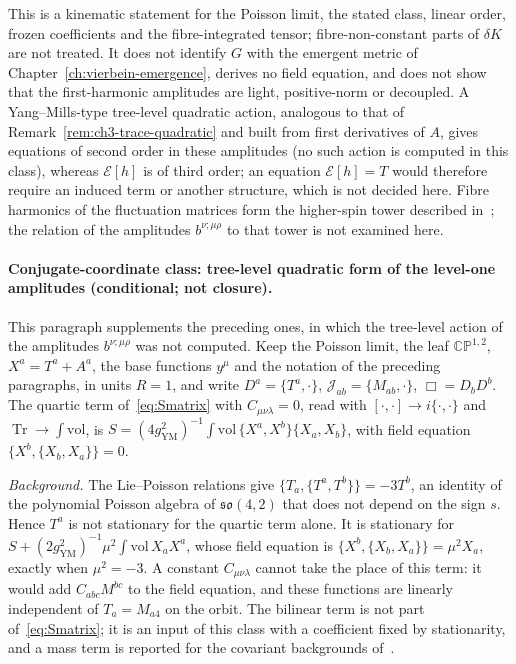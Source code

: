 This is a kinematic statement for the Poisson limit, the stated class, linear order, frozen coefficients and the fibre-integrated tensor; fibre-non-constant parts of \(\delta K\) are not treated. It does not identify \(G\) with the emergent metric of Chapter~\ref{ch:vierbein-emergence}, derives no field equation, and does not show that the first-harmonic amplitudes are light, positive-norm or decoupled. A Yang--Mills-type tree-level quadratic action, analogous to that of Remark~\ref{rem:ch3-trace-quadratic} and built from first derivatives of \(A\), gives equations of second order in these amplitudes (no such action is computed in this class), whereas \(\mathcal E[h]\) is of third order; an equation \(\mathcal E[h]=T\) would therefore require an induced term or another structure, which is not decided here. Fibre harmonics of the fluctuation matrices form the higher-spin tower described in~\cite{SperlingSteinacker2019,MantaSteinacker2025}; the relation of the amplitudes \(b^{\nu;\mu\rho}\) to that tower is not examined here.





\paragraph{Conjugate-coordinate class: tree-level quadratic form of the level-one amplitudes (conditional; not closure).} \label{detail:sec-F-paragraphconjugatecoordinatecl-31}

This paragraph supplements the preceding ones, in which the tree-level action of the amplitudes \(b^{\nu;\mu\rho}\) was not computed. Keep the Poisson limit, the leaf \(\mathbb{CP}^{1,2}\), \(X^a=T^a+A^a\), the base functions \(y^\mu\) and the notation of the preceding paragraphs, in units \(R=1\), and write \(D^a=\{T^a,\cdot\}\), \(\mathcal J_{ab}=\{M_{ab},\cdot\}\), \(\Box=D_bD^b\). The quartic term of~\eqref{eq:Smatrix} with \(C_{\mu\nu\lambda}=0\), read with \([\cdot,\cdot]\to i\{\cdot,\cdot\}\) and \(\operatorname{Tr}\to\int\mathrm{vol}\), is \(S=(4g_{\mathrm{YM}}^2)^{-1}\int\mathrm{vol}\,\{X^a,X^b\}\{X_a,X_b\}\), with field equation \(\{X^b,\{X_b,X_a\}\}=0\).



\emph{Background.} The Lie--Poisson relations give \(\{T_a,\{T^a,T^b\}\}=-3T^b\), an identity of the polynomial Poisson algebra of \(\mathfrak{so}(4,2)\) that does not depend on the sign \(s\). Hence \(T^a\) is not stationary for the quartic term alone. It is stationary for \(S+(2g_{\mathrm{YM}}^2)^{-1}\mu^2\int\mathrm{vol}\,X_aX^a\), whose field equation is \(\{X^b,\{X_b,X_a\}\}=\mu^2X_a\), exactly when \(\mu^2=-3\). A constant \(C_{\mu\nu\lambda}\) cannot take the place of this term: it would add \(C_{abc}M^{bc}\) to the field equation, and these functions are linearly independent of \(T_a=M_{a4}\) on the orbit. The bilinear term is not part of~\eqref{eq:Smatrix}; it is an input of this class with a coefficient fixed by stationarity, and a mass term is reported for the covariant backgrounds of~\cite{SperlingSteinacker2019}.



